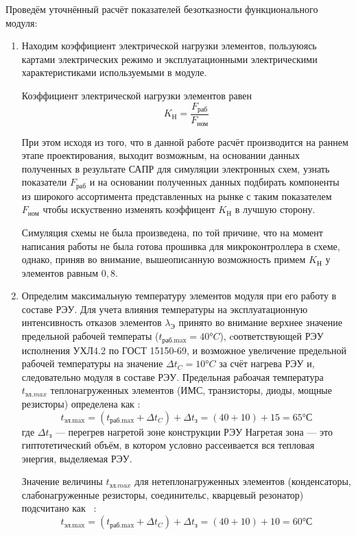Проведём уточнённый расчёт показателей безотказности функционального модуля:
\begin{enumerate}
\item Находим коэффициент электрической нагрузки элементов, пользуюясь
картами электрических режимо и эксплуатационными электрическими
характеристиками используемыми в модуле.

Коэффициент электрической нагрузки элементов равен
\begin{equation}
  K_{\textrm{Н}} = \frac{F_{\textrm{раб}}}{F_{\textrm{ном}}}
\end{equation}

При этом исходя из того, что в данной работе расчёт производится на
раннем этапе проектирования, выходит возможным, на
основании данных полученных в результате САПР для симуляции
электронных схем, узнать показатели $F_{\textrm{раб}}$ и
на основании полученных данных подбирать компоненты из широкого
ассортимента представленных на рынке с таким показателем
$F_{\textrm{ном}}$ чтобы искуственно изменять коэффицент
$  K_{\textrm{Н}}$ в лучшую сторону.

Симуляция схемы не была произведена, по той причине, что на момент
написания работы не была готова прошивка для микроконтроллера в схеме,
однако, приняв во внимание,  вышеописанную возможность примем
$K_{\textrm{Н}}$ у элементов равным $0,8$.
\item Определим максимальную температуру элементов модуля при его
  работу в составе РЭУ.
  Для учета влияния температуры на эксплуатационную интенсивность
  отказов элементов  $\lambda_{\textrm{Э}}$ принято во внимание
  верхнее значение предельной рабочей температы
  ($t_{\textrm{раб.max}}= 40°C$), cоответствующей РЭУ
  исполнения УХЛ4.2 по ГОСТ 15150-69, и возможное увеличение предельной рабочей температуры на значение
  $\Delta t_C = 10°C$ за счёт нагрева РЭУ и, следовательно модуля в составе РЭУ.
  Предельная рабоачая температура $t_{эл.max}$ теплонагруженных
  элементов (ИМС, транзисторы, диоды, мощные резисторы) определена как \cite{Borovikov2010}:
  \begin{equation}
    t_{\textrm{эл.max}} = (t_{\textrm{раб.max}} + \Delta t_C) + \Delta t_{\textrm{з}} = (40 + 10) +15 = 65°С
  \end{equation}
  где $\Delta t_{\textrm{з}}$ — перегрев нагретой зоне конструкции РЭУ
  Нагретая зона — это гиптотетический объём, в котором условно
  рассеивается вся тепловая энергия, выделяемая РЭУ.

  Значение величины $t_{эл.max}$  для нетеплонагруженных элементов
  (конденсаторы, слабонагруженные резисторы, соединительс, кварцевый резонатор)
  подсчитано как ~\cite{Borovikov2010}:
  \begin{equation}
    t_{\textrm{эл.max}} = (t_{\textrm{раб.max}} + \Delta t_C) + \Delta t_{\textrm{з}} = (40 + 10) +10 = 60°С
  \end{equation}
  

\end{enumerate}
